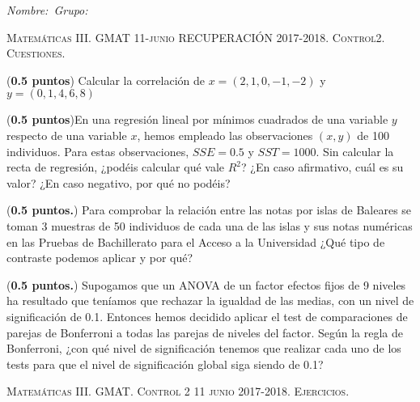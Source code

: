 \documentclass[10pt]{article}
\newcounter{problemes}
\newcounter{punts} \def\thepunts{\arabic{punts}}
\def\probl{\addtocounter{problemes}{1} \setcounter{punts}{0}
\medskip\noindent{\bf \theproblemes) }}
\begin{document}

\noindent\emph{Nombre:}\hfill\hfill\hfill\hfill\hfill\hfill\hfill\ \emph{Grupo:}\hfill \vspace*{-2ex}




\begin{center}
\textsc{Matemáticas III. GMAT 11-junio RECUPERACIÓN 2017-2018.  Control2. Cuestiones.}\\[1ex]%
\end{center}



\probl (\textbf{0.5 puntos})
Calcular la correlación de $x=(2,1,0,-1,-2)$ y $y=(0,1,4,6,8)$
\vspace{4cm}

\probl (\textbf{0.5 puntos})En una regresión lineal por mínimos cuadrados de una variable
$y$  respecto de una variable $x$, hemos empleado las observaciones $(x,y)$
de 100 individuos. Para estas observaciones, $SSE=0.5$ y $SST=1000$. Sin calcular la recta de regresión, ¿podéis calcular qué vale $R^2$? ¿En caso afirmativo, cuál es su valor? ¿En caso negativo, por qué no podéis?
\vspace{4cm}

\probl  (\textbf{0.5 puntos.})   Para comprobar la relación entre  las notas por islas de Baleares se toman 3 muestras de 50 individuos de cada una de las islas y sus notas numéricas  en las Pruebas de Bachillerato para el Acceso a la Universidad ¿Qué tipo de contraste podemos aplicar y por qué?


\vspace{4cm} 
 
\probl  (\textbf{0.5 puntos.}) Supogamos que un ANOVA de un factor efectos fijos de 9 niveles  ha resultado que teníamos que rechazar la igualdad de las medias, con un nivel de significación de 0.1. Entonces hemos decidido aplicar el test de comparaciones de parejas de Bonferroni a todas las parejas de niveles del factor. 
Según la regla de Bonferroni, ¿con qué nivel de significación tenemos que realizar cada uno de los tests para que  el nivel de significación global siga siendo de 0.1?




\vspace{3cm} 
 
\begin{center}
\textsc{Matemáticas III. GMAT. Control 2 11 junio 2017-2018. Ejercicios.}
\end{center}
\end{document}
